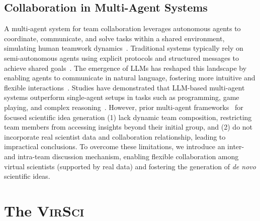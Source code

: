 \documentclass[11pt]{article}
\def\modelname{\textsc{VirSci\xspace}}
\begin{document}
\subsection{Collaboration in Multi-Agent Systems}
A multi-agent system for team collaboration leverages autonomous agents to coordinate, communicate, and solve tasks within a shared environment, simulating human teamwork dynamics~\citep{dorri2018multi}. Traditional systems typically rely on semi-autonomous agents using explicit protocols and structured messages to achieve shared goals~\citep{dunin2011teamwork, bakliwal2018multi}.
The emergence of LLMs has reshaped this landscape by enabling agents to communicate in natural language, fostering more intuitive and flexible interactions~\citep{park2023generative}. Studies have demonstrated that LLM-based multi-agent systems outperform single-agent setups in tasks such as programming, game playing, and complex reasoning~\citep{du2024multi, wang2024rethinking, light2023avalonbench}. 
However, prior multi-agent frameworks~\citep{qi2024large,yu2024researchtown} for focused scientific idea generation (1) lack dynamic team composition, restricting team members from accessing insights beyond their initial group, and (2) do not incorporate real scientist data and collaboration relationship, leading to impractical conclusions. To overcome these limitations, we introduce an inter- and intra-team discussion mechanism, enabling flexible collaboration among virtual scientists (supported by real data) and fostering the generation of \textit{de novo} scientific ideas.


\section{The \modelname}
\label{headings}
\end{document}

